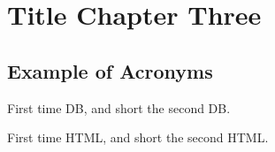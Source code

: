 \chapter{Title Chapter Three}

\section{Example of Acronyms}

First time \gls{DB}, and short the second \gls{DB}.
\par
First time \gls{HTML}, and short the second \gls{HTML}.